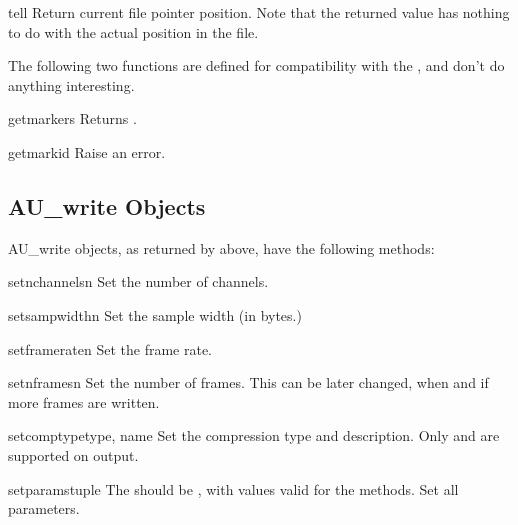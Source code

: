 \begin{methoddesc}[AU_read]{tell}{}
Return current file pointer position.  Note that the returned value
has nothing to do with the actual position in the file.
\end{methoddesc}

The following two functions are defined for compatibility with the 
, and don't do anything interesting.

\begin{methoddesc}[AU_read]{getmarkers}{}
Returns .
\end{methoddesc}

\begin{methoddesc}[AU_read]{getmark}{id}
Raise an error.
\end{methoddesc}


\subsection{AU_write Objects \label{au-write-objects}}

AU_write objects, as returned by  above, have the
following methods:

\begin{methoddesc}[AU_write]{setnchannels}{n}
Set the number of channels.
\end{methoddesc}

\begin{methoddesc}[AU_write]{setsampwidth}{n}
Set the sample width (in bytes.)
\end{methoddesc}

\begin{methoddesc}[AU_write]{setframerate}{n}
Set the frame rate.
\end{methoddesc}

\begin{methoddesc}[AU_write]{setnframes}{n}
Set the number of frames. This can be later changed, when and if more 
frames are written.
\end{methoddesc}


\begin{methoddesc}[AU_write]{setcomptype}{type, name}
Set the compression type and description.
Only  and  are supported on output.
\end{methoddesc}

\begin{methoddesc}[AU_write]{setparams}{tuple}
The  should be , with
values valid for the  methods.  Set all parameters.
\end{methoddesc}

